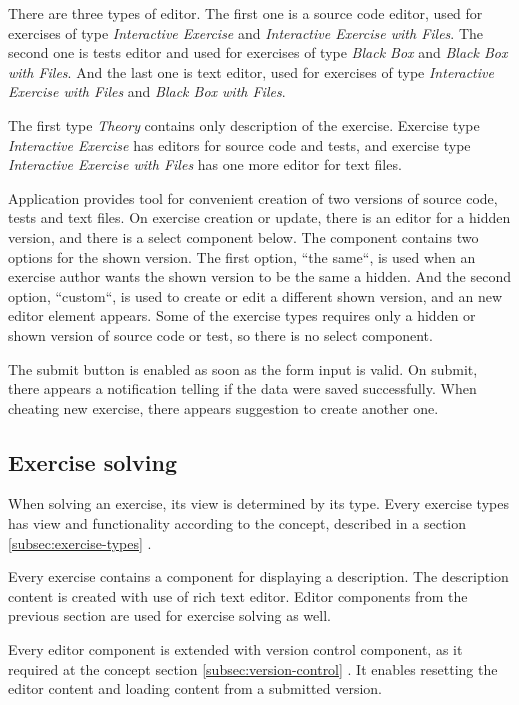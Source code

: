     There are three types of editor. The first one is a source code editor, used for exercises of type \textit{Interactive Exercise} and \textit{Interactive Exercise with Files}. The second one is tests editor and used for exercises of type \textit{Black Box} and \textit{Black Box with Files}. And the last one is text editor, used for exercises of type \textit{Interactive Exercise with Files} and \textit{Black Box with Files}.
    
    The first type \textit{Theory} contains only description of the exercise. Exercise type \textit{Interactive Exercise} has editors for source code and tests, and exercise type \textit{Interactive Exercise with Files} has one more editor for text files.
    
    Application provides tool for convenient creation of two versions of source code, tests and text files. On exercise creation or update, there is an editor for a hidden version, and there is a select component below. The component contains two options for the shown version. The first option, ``the same``, is used when an exercise author wants the shown version to be the same a hidden. And the second option, ``custom``, is used to create or edit a different shown version, and an new editor element appears. Some of the exercise types requires only a hidden or shown version of source code or test, so there is no select component.
    
    The submit button is enabled as soon as the form input is valid. On submit, there appears a notification telling if the data were saved successfully. When cheating new exercise, there appears suggestion to create another one.
    
    
    \subsection{Exercise solving}
    When solving an exercise, its view is determined by its type. Every exercise types has view and functionality according to the concept, described in a section \ref{subsec:exercise-types} .
    
    Every exercise contains a component for displaying a description. The description content is created with use of rich text editor. Editor components from the previous section are used for exercise solving as well.
    
    Every editor component is extended with version control component, as it required at the concept section \ref{subsec:version-control} . It enables resetting the editor content and loading content from a submitted version.
    
